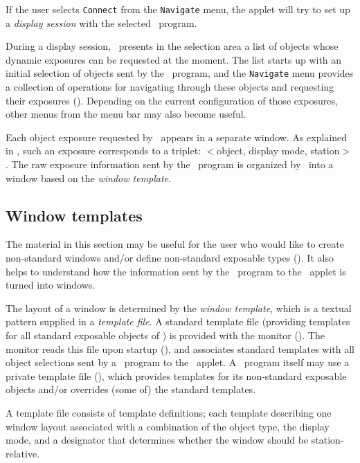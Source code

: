 If the user selects {\tt Connect} from the {\tt Navigate} menu,
the applet will try to set up a {\em display session\/}
with the selected \smurph\ program.

During a display session,
\dsd\ presents in the selection area a list
of objects whose dynamic exposures can be requested at the moment.
The list starts up with an initial selection of objects
sent by the \smurph\ program, and the
{\tt Navigate} menu provides a collection of
operations for navigating through these objects and requesting their
exposures ().
Depending on the current configuration of those exposures,
other menus from the menu bar may also become useful.

Each object exposure requested by \dsd\ appears in a separate window.
As explained in , such an exposure corresponds to
a triplet: $<$object, display mode, station$>$.
The raw exposure information sent by the \smurph\ program is organized
by \dsd\ into a window based on the {\em window template}.

\subsection{Window templates}
\label{rm_ds_tp}

The material in this section may be useful for the user who would like to
create non-standard windows and/or define non-standard exposable types
().
It also helps to understand how the information
sent by the \smurph\ program to the \dsd\ applet is turned into windows.

The layout of a window is determined by the {\em window template}, which is
a textual pattern supplied in a {\em template file}.
A standard template file (providing templates
for all standard exposable objects of \smurph) is provided with the
monitor ().
The monitor reads this file upon startup (), and associates
standard templates with all object selections sent by a \smurph\ program
to the \dsd\ applet.
A \smurph\ program itself may use a private template file (),
which provides templates for its non-standard exposable objects and/or
overrides (some of) the standard templates.

A template file consists of template definitions; each template describing
one window layout associated with a combination of the object type,
the display mode, and a designator that determines whether the window
should be station-relative.


